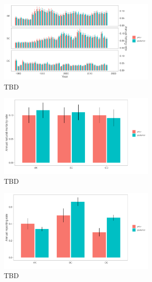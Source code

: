 \documentclass{article}
\begin{document}
\begin{figure}[htb]
    \centering
    \includegraphics[width = 0.7\textwidth]{bar-regions-3-fishing-priors-posteriors}
    \caption{TBD}
    \label{fig:bar-regions-3-fishing-priors-posteriors}
\end{figure}

\begin{figure}[htb]
    \centering
    \includegraphics[width = 0.7\textwidth]{bar-regions-3-mortality-priors-posteriors}
    \caption{TBD}
    \label{fig:bar-regions-3-mortality-priors-posteriors}
\end{figure}

\begin{figure}[htb]
    \centering
    \includegraphics[width = 0.7\textwidth]{bar-regions-3-reporting-priors-posteriors}
    \caption{TBD}
    \label{fig:bar-regions-3-reporting-priors-posteriors}
\end{figure}
\end{document}
